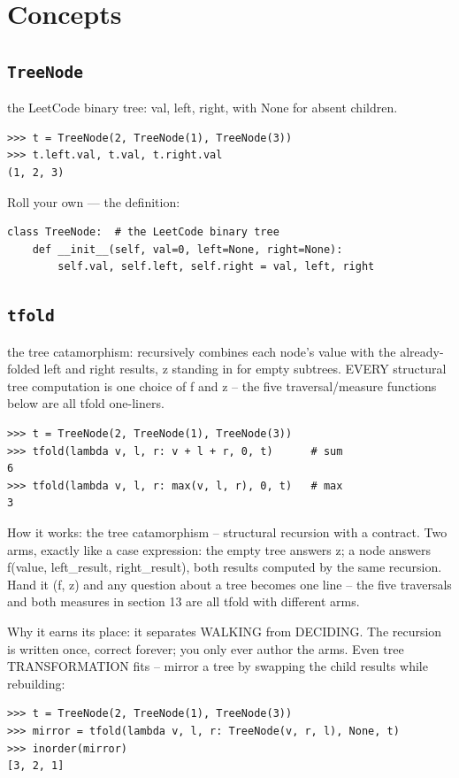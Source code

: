 \documentclass[10pt,letterpaper]{book}
\begin{document}
\section{Concepts}
\subsection{\texttt{TreeNode}}\label{def:TreeNode}
the LeetCode binary tree: val, left, right, with None for absent children.
\begin{lstlisting}[style=ex]
>>> t = TreeNode(2, TreeNode(1), TreeNode(3))
>>> t.left.val, t.val, t.right.val
(1, 2, 3)
\end{lstlisting}

Roll your own --- the definition:

\begin{lstlisting}[style=ex]
class TreeNode:  # the LeetCode binary tree
    def __init__(self, val=0, left=None, right=None):
        self.val, self.left, self.right = val, left, right
\end{lstlisting}
\subsection{\texttt{tfold}}\label{def:tfold}
the tree catamorphism: recursively combines each node's value with the already-folded left and right results, z standing in for empty subtrees. EVERY structural tree computation is one choice of f and z -- the five traversal/measure functions below are all tfold one-liners.
\begin{lstlisting}[style=ex]
>>> t = TreeNode(2, TreeNode(1), TreeNode(3))
>>> tfold(lambda v, l, r: v + l + r, 0, t)      # sum
6
>>> tfold(lambda v, l, r: max(v, l, r), 0, t)   # max
3
\end{lstlisting}

How it works: the tree catamorphism -- structural recursion with a contract. Two arms, exactly like a case expression: the empty tree answers z; a node answers f(value, left\_result, right\_result), both results computed by the same recursion. Hand it (f, z) and any question about a tree becomes one line -- the five traversals and both measures in section 13 are all tfold with different arms.


Why it earns its place: it separates WALKING from DECIDING. The recursion is written once, correct forever; you only ever author the arms. Even tree TRANSFORMATION fits -- mirror a tree by swapping the child results while rebuilding:

\begin{lstlisting}[style=ex]
>>> t = TreeNode(2, TreeNode(1), TreeNode(3))
>>> mirror = tfold(lambda v, l, r: TreeNode(v, r, l), None, t)
>>> inorder(mirror)
[3, 2, 1]
\end{lstlisting}
\end{document}
